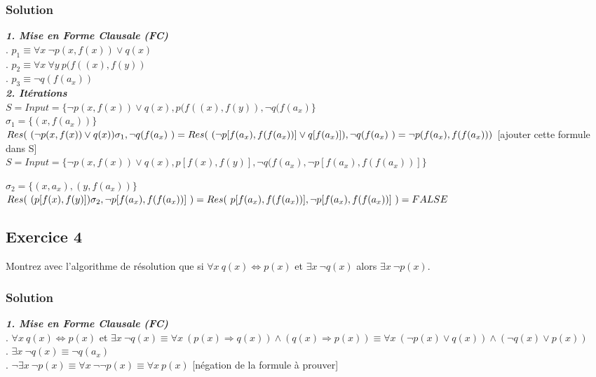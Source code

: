     \subsubsection*{Solution}
    
    \textbf{\textit{ 1. Mise en Forme Clausale (FC)}} \\
    . $p_1 \equiv \forall x \ \neg p(x, f(x)) \lor q(x) $\\
    . $p_2 \equiv \forall x \ \forall y \ p(f((x), f(y)) $\\
    . $p_3 \equiv \neg q(f(a_x))$ \\
    
    \textbf{\textit{2. Itérations }} \\
    $ S = Input = \{ \neg p(x, f(x)) \lor q(x), p(f((x), f(y)), \neg q(f(a_x) \} $ \\
    $ \sigma_1 = \{ (x, f(a_x)) \} $ \\
    $ Res( \ ( \neg p(x, f(x)) \lor q(x))\sigma_1, \neg q(f(a_x) \ ) = Res( \ ( \neg p[f(a_x), f(f(a_x))] \lor q[f(a_x)] ), \neg q(f(a_x)  \ ) \\ = \neg p(f(a_x), f(f(a_x))) $  [ajouter cette formule dans S] \\
    $ S = Input = \{ \neg p(x, f(x)) \lor q(x), p[f(x), f(y)], \neg q(f(a_x), \neg p[f(a_x), f(f(a_x))] \} $
     
    \noindent $ \sigma_{2} = \{ (x,a_x), (y,f(a_x) ) \}$\\
    $ Res( \ (p[f(x), f(y)])\sigma_2, \neg p[f(a_x), f(f(a_x))] \ ) \\ = Res( \ p[f(a_x), f(f(a_x))], \neg p[f(a_x), f(f(a_x))] \ ) = FALSE $\\ 
    


\subsection*{Exercice 4}
Montrez avec l'algorithme de r\'{e}solution que si $\forall x \ q(x) \Leftrightarrow p(x)$ et $\exists x \ \neg q(x)$ alors $\exists x \ \neg p(x)$.

    \subsubsection*{Solution}
    
   \textbf{\textit{ 1. Mise en Forme Clausale (FC)}} \\
    . $\forall x \ q(x) \Leftrightarrow p(x)$ et $\exists x \ \neg q(x) \equiv \forall x \ (p(x) \Rightarrow q(x)) \land (q(x) \Rightarrow p(x)) 
     \equiv \forall x \ (\neg p(x) \lor q(x)) \land (\neg q(x) \lor p(x)) $ \\
    . $\exists x \ \neg q(x) \equiv \neg q(a_{x}) $  \\
    . $\neg \exists x \ \neg p(x) \equiv \forall x \ \neg \neg p(x) \equiv \forall x \ p(x) $ [négation de la formule à prouver] \\
    
